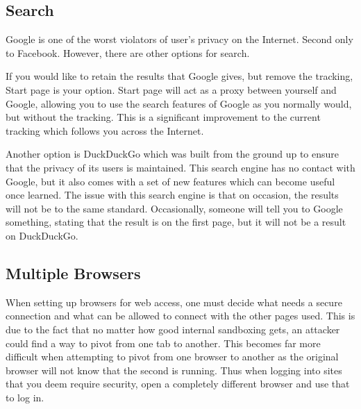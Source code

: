 		\subsection{Search}
			Google is one of the worst violators of user's privacy on the Internet. Second only to Facebook.
			However, there are other options for search. \par
			If you would like to retain the results that Google gives, but remove the tracking, Start page is your option.
			Start page will act as a proxy between yourself and Google, allowing you to use the search features of Google as you normally would, but without the tracking.
			This is a significant improvement to the current tracking which follows you across the Internet. \par
			Another option is DuckDuckGo which was built from the ground up to ensure that the privacy of its users is maintained.
			This search engine has no contact with Google, but it also comes with a set of new features which can become useful once learned.
			The issue with this search engine is that on occasion, the results will not be to the same standard.
			Occasionally, someone will tell you to Google something, stating that the result is on the first page, but it will not be a result on DuckDuckGo.
		\subsection{Multiple Browsers}
			When setting up browsers for web access, one must decide what needs a secure connection and what can be allowed to connect with the other pages used.
			This is due to the fact that no matter how good internal sandboxing gets, an attacker could find a way to pivot from one tab to another.
			This becomes far more difficult when attempting to pivot from one browser to another as the original browser will not know that the second is running.
			Thus when logging into sites that you deem require security, open a completely different browser and use that to log in.
